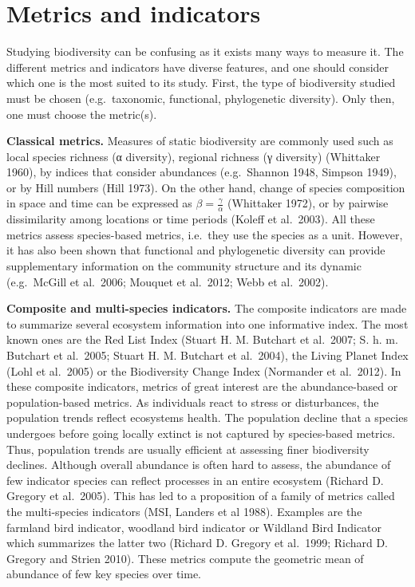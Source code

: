 \documentclass[
  12pt,
  oneside]{report}
\begin{document}
\hypertarget{metrics-and-indicators}{%
\chapter{Metrics and indicators}\label{metrics-and-indicators}}

Studying biodiversity can be confusing as it exists many ways to measure it. The different metrics and indicators have diverse features, and one should consider which one is the most suited to its study. First, the type of biodiversity studied must be chosen (e.g.~taxonomic, functional, phylogenetic diversity). Only then, one must choose the metric(s).

\textbf{Classical metrics.} Measures of static biodiversity are commonly used such as local species richness (α diversity), regional richness (γ diversity) (Whittaker 1960), by indices that consider abundances (e.g.~Shannon 1948, Simpson 1949), or by Hill numbers (Hill 1973). On the other hand, change of species composition in space and time can be expressed as \(\beta = \frac{\gamma}{\alpha}\) (Whittaker 1972), or by pairwise dissimilarity among locations or time periods (Koleff et al.~2003). All these metrics assess species-based metrics, i.e.~they use the species as a unit. However, it has also been shown that functional and phylogenetic diversity can provide supplementary information on the community structure and its dynamic (e.g.~McGill et al.~2006; Mouquet et al.~2012; Webb et al.~2002).

\textbf{Composite and multi-species indicators.} The composite indicators are made to summarize several ecosystem information into one informative index. The most known ones are the Red List Index (Stuart H. M. Butchart et al.~2007; S. h. m. Butchart et al.~2005; Stuart H. M. Butchart et al.~2004), the Living Planet Index (Lohl et al.~2005) or the Biodiversity Change Index (Normander et al.~2012). In these composite indicators, metrics of great interest are the abundance-based or population-based metrics. As individuals react to stress or disturbances, the population trends reflect ecosystems health. The population decline that a species undergoes before going locally extinct is not captured by species-based metrics. Thus, population trends are usually efficient at assessing finer biodiversity declines. Although overall abundance is often hard to assess, the abundance of few indicator species can reflect processes in an entire ecosystem (Richard D. Gregory et al.~2005). This has led to a proposition of a family of metrics called the multi-species indicators (MSI, Landers et al 1988). Examples are the farmland bird indicator, woodland bird indicator or Wildland Bird Indicator which summarizes the latter two (Richard D. Gregory et al.~1999; Richard D. Gregory and Strien 2010). These metrics compute the geometric mean of abundance of few key species over time.
\end{document}
